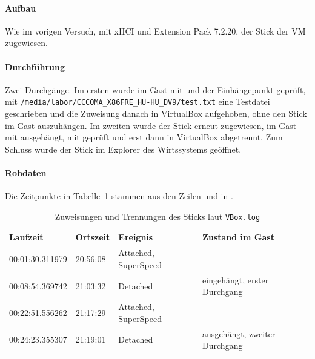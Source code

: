 \begin{messung}
\paragraph{Aufbau} Wie im vorigen Versuch, mit xHCI und Extension Pack 7.2.20, der Stick der VM zugewiesen.

\paragraph{Durchführung} Zwei Durchgänge. Im ersten wurde im Gast mit  und  der Einhängepunkt geprüft, mit  \nolinkurl{/media/labor/CCCOMA_X86FRE_HU-HU_DV9/test.txt}  eine Testdatei geschrieben und die Zuweisung danach in VirtualBox aufgehoben, ohne den Stick im Gast auszuhängen. Im zweiten wurde der Stick erneut zugewiesen, im Gast mit  ausgehängt, mit  geprüft und erst dann in VirtualBox abgetrennt. Zum Schluss wurde der Stick im Explorer des Wirtssystems geöffnet.

\paragraph{Rohdaten} Die Zeitpunkte in Tabelle~\ref{tab:usb-trennung} stammen aus den Zeilen  und  in .

\begin{table}[H]
\centering
\caption{Zuweisungen und Trennungen des Sticks laut \texttt{VBox.log}}
\label{tab:usb-trennung}
\begin{tabularx}{\textwidth}{@{}lllX@{}}
\toprule
\textbf{Laufzeit} & \textbf{Ortszeit} & \textbf{Ereignis} & \textbf{Zustand im Gast} \\
\midrule
00:01:30.311979 & 20:56:08 & Attached, SuperSpeed & \\
00:08:54.369742 & 21:03:32 & Detached & eingehängt, erster Durchgang \\
00:22:51.556262 & 21:17:29 & Attached, SuperSpeed & \\
00:24:23.355307 & 21:19:01 & Detached & ausgehängt, zweiter Durchgang \\
\bottomrule
\end{tabularx}
\end{table}



\end{messung}
